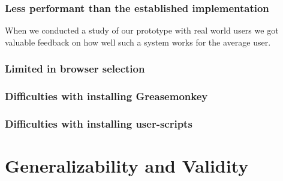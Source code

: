 \subsubsection{Less performant than the established implementation}

\parabreak

When we conducted a study of our prototype with real world users
we got valuable feedback on how well such a system works for the average user.

\subsubsection{Limited in browser selection}

\subsubsection{Difficulties with installing Greasemonkey}

\subsubsection{Difficulties with installing user-scripts}

\section{Generalizability and Validity}
